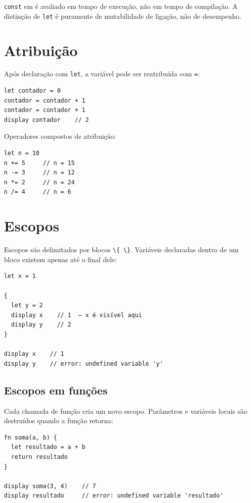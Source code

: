 \begin{nota}
  \lstinline{const} em \hayashi{} é avaliado em tempo de execução, não em tempo de
  compilação. A distinção de \lstinline{let} é puramente de mutabilidade de ligação,
  não de desempenho.
\end{nota}

\section{Atribuição}

Após declaração com \lstinline{let}, a variável pode ser reatribuída com \lstinline{=}:

\begin{lstlisting}
let contador = 0
contador = contador + 1
contador = contador + 1
display contador    // 2
\end{lstlisting}

Operadores compostos de atribuição:

\begin{lstlisting}
let n = 10
n += 5     // n = 15
n -= 3     // n = 12
n *= 2     // n = 24
n /= 4     // n = 6
\end{lstlisting}

\section{Escopos}

Escopos são delimitados por blocos \lstinline|\{ \}|. Variáveis declaradas dentro de
um bloco existem apenas até o final dele:

\begin{lstlisting}[caption={Variáveis locais a um bloco}]
let x = 1

{
  let y = 2
  display x    // 1  — x é visível aqui
  display y    // 2
}

display x    // 1
display y    // error: undefined variable 'y'
\end{lstlisting}

\subsection*{Escopos em funções}

Cada chamada de função cria um novo escopo. Parâmetros e variáveis locais são
destruídos quando a função retorna:

\begin{lstlisting}
fn soma(a, b) {
  let resultado = a + b
  return resultado
}

display soma(3, 4)    // 7
display resultado     // error: undefined variable 'resultado'
\end{lstlisting}


